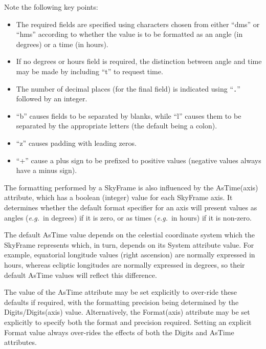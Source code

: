 \documentclass[twoside,11pt]{article}
\newcommand{\htmlref}[2]{#1}
\begin{document}
Note the following key points:

\begin{itemize}
\item The required fields are specified using characters chosen from
either ``dms'' or ``hms'' according to whether the value is to be
formatted as an angle (in degrees) or a time (in hours).

\item If no degrees or hours field is required, the distinction
between angle and time may be made by including ``t'' to request time.

\item The number of decimal places (for the final field) is indicated
using ``{\tt{.}}'' followed by an integer.

\item ``b'' causes fields to be separated by blanks, while ``l''
causes them to be separated by the appropriate letters (the default
being a colon).

\item ``z'' causes padding with leading zeros.

\item ``+'' cause a plus sign to be prefixed to positive values
(negative values always have a minus sign).
\end{itemize}

The formatting performed by a SkyFrame is also influenced by the
\htmlref{AsTime(axis)}{AsTimeaxis} attribute, which has a boolean (integer) value for each
SkyFrame axis.  It determines whether the default format specifier for
an axis will present values as angles ({\em{e.g.}}\ in degrees) if it
is zero, or as times ({\em{e.g.}}\ in hours) if it is non-zero.

The default AsTime value depends on the celestial coordinate system
which the SkyFrame represents which, in turn, depends on its \htmlref{System}{System}
attribute value. For example, equatorial longitude values (right
ascension) are normally expressed in hours, whereas ecliptic
longitudes are normally expressed in degrees, so their default AsTime
values will reflect this difference.

The value of the AsTime attribute may be set explicitly to over-ride
these defaults if required, with the formatting precision being
determined by the \htmlref{Digits/Digits(axis)}{DigitsDigitsaxis} value. Alternatively, the
Format(axis) attribute may be set explicitly to specify both the
format and precision required. Setting an explicit Format value always
over-rides the effects of both the Digits and AsTime attributes.
\end{document}
